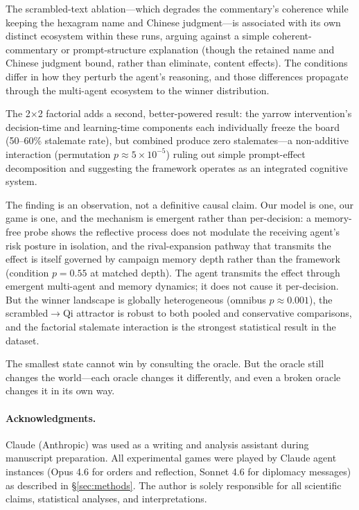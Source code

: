 \documentclass[11pt]{article}
\begin{document}
The scrambled-text ablation---which degrades the commentary's coherence while keeping the hexagram name and Chinese judgment---is associated with its own distinct ecosystem within these runs, arguing against a simple coherent-commentary or prompt-structure explanation (though the retained name and Chinese judgment bound, rather than eliminate, content effects). The conditions differ in how they perturb the agent's reasoning, and those differences propagate through the multi-agent ecosystem to the winner distribution.

The 2$\times$2 factorial adds a second, better-powered result: the yarrow intervention's decision-time and learning-time components each individually freeze the board (50--60\% stalemate rate), but combined produce zero stalemates---a non-additive interaction (permutation $p \approx 5\times10^{-5}$) ruling out simple prompt-effect decomposition and suggesting the framework operates as an integrated cognitive system.

The finding is an observation, not a definitive causal claim. Our model is one, our game is one, and the mechanism is emergent rather than per-decision: a memory-free probe shows the reflective process does not modulate the receiving agent's risk posture in isolation, and the rival-expansion pathway that transmits the effect is itself governed by campaign memory depth rather than the framework (condition $p = 0.55$ at matched depth). The agent transmits the effect through emergent multi-agent and memory dynamics; it does not cause it per-decision. But the winner landscape is globally heterogeneous (omnibus $p \approx 0.001$), the scrambled$\to$Qi attractor is robust to both pooled and conservative comparisons, and the factorial stalemate interaction is the strongest statistical result in the dataset.

The smallest state cannot win by consulting the oracle. But the oracle still changes the world---each oracle changes it differently, and even a broken oracle changes it in its own way.

\paragraph{Acknowledgments.}
Claude (Anthropic) was used as a writing and analysis assistant during manuscript preparation. All experimental games were played by Claude agent instances (Opus 4.6 for orders and reflection, Sonnet 4.6 for diplomacy messages) as described in \S\ref{sec:methods}. The author is solely responsible for all scientific claims, statistical analyses, and interpretations.
\end{document}
